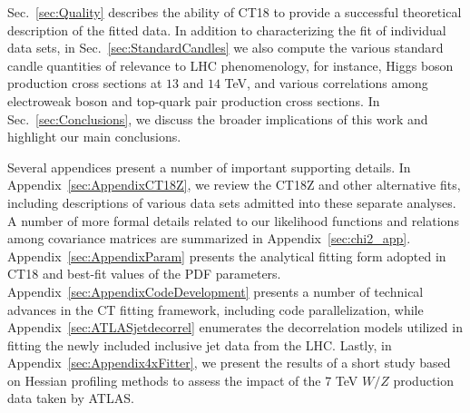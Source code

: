 Sec.~\ref{sec:Quality} describes the ability of CT18 to provide a successful theoretical
description of the fitted data.
In addition to characterizing the fit of individual data sets, in Sec.~\ref{sec:StandardCandles}
we also compute the various standard candle quantities of relevance to LHC phenomenology, for
instance, Higgs boson production cross sections at $13$ and $14$ TeV, and various correlations among
electroweak boson and top-quark pair production cross sections.
In Sec.~\ref{sec:Conclusions}, we discuss the broader implications of this work and highlight
our main conclusions.

Several appendices present a number of important supporting details.
In Appendix~\ref{sec:AppendixCT18Z}, we review the CT18Z and other alternative fits,
including descriptions of various data sets admitted into these separate analyses.
A number of more formal details related to our likelihood functions and relations
among covariance matrices are summarized in Appendix~\ref{sec:chi2_app}.
Appendix~\ref{sec:AppendixParam} presents the analytical fitting form adopted in CT18
and best-fit values of the PDF parameters.
Appendix~\ref{sec:AppendixCodeDevelopment} presents a number of technical advances
in the CT fitting framework, including code parallelization, while Appendix~\ref{sec:ATLASjetdecorrel}
enumerates the decorrelation models utilized in fitting the newly included inclusive
jet data from the LHC.
Lastly, in Appendix~\ref{sec:Appendix4xFitter}, we present the results of a short study based on Hessian profiling
methods to assess the impact of the 7 TeV $W/Z$ production data taken by ATLAS.

